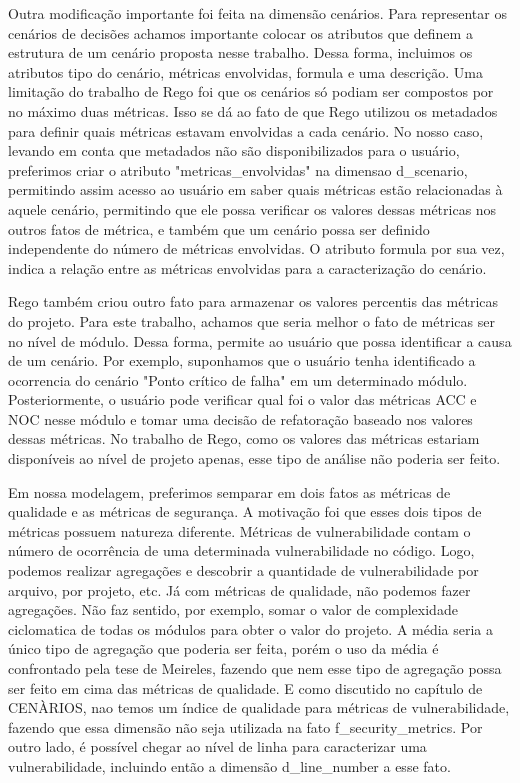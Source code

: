 Outra modificação importante foi feita na dimensão cenários. Para representar os cenários de decisões achamos importante colocar os atributos que definem a estrutura de um cenário proposta nesse trabalho. Dessa forma, incluimos os atributos tipo do cenário, métricas envolvidas, formula e uma descrição. Uma limitação do trabalho de Rego foi que os cenários só podiam ser compostos por no máximo duas métricas. Isso se dá ao fato de que Rego utilizou os metadados para definir quais métricas estavam envolvidas a cada cenário. No nosso caso, levando em conta que  metadados não são disponibilizados para o usuário, preferimos criar o atributo "metricas\_envolvidas" na dimensao d\_scenario, permitindo assim acesso ao usuário em saber quais métricas estão relacionadas à aquele cenário, permitindo que ele possa verificar os valores dessas métricas nos outros fatos de métrica, e também que um cenário possa ser definido independente do número de métricas envolvidas. O atributo formula por sua vez, indica a relação entre as métricas envolvidas para a caracterização do cenário.


Rego também criou outro fato para armazenar os valores percentis das métricas do projeto. Para este trabalho, achamos que seria melhor o fato de métricas ser no nível de módulo. Dessa forma, permite ao usuário que possa identificar a causa de um cenário. Por exemplo, suponhamos que o usuário tenha identificado a ocorrencia do cenário "Ponto crítico de falha" em um determinado módulo. Posteriormente, o usuário pode verificar qual foi o valor das métricas ACC e NOC nesse módulo e tomar uma decisão de refatoração baseado nos valores dessas métricas. No trabalho de Rego, como os valores das métricas estariam disponíveis ao nível de projeto apenas, esse tipo de análise não poderia ser feito.

Em nossa modelagem, preferimos semparar em dois fatos as métricas de qualidade e as métricas de segurança. A motivação foi que esses dois tipos de métricas possuem natureza diferente. Métricas de vulnerabilidade contam o número de ocorrência de uma determinada vulnerabilidade no código. Logo, podemos realizar agregações e descobrir a quantidade de vulnerabilidade por arquivo, por projeto, etc. Já com métricas de qualidade, não podemos fazer agregações. Não faz sentido, por exemplo, somar o valor de complexidade ciclomatica de todas os módulos para obter o valor do projeto. A média seria a único tipo de agregação que poderia ser feita, porém o uso da média é confrontado pela tese de Meireles, fazendo que nem esse tipo de agregação possa ser feito em cima das métricas de qualidade. E como discutido no capítulo de CENÀRIOS, nao temos um índice de qualidade para métricas de vulnerabilidade, fazendo que essa dimensão não seja utilizada na fato f\_security\_metrics. Por outro lado, é possível chegar ao nível de linha para caracterizar uma vulnerabilidade, incluindo então a dimensão d\_line\_number a esse fato.

